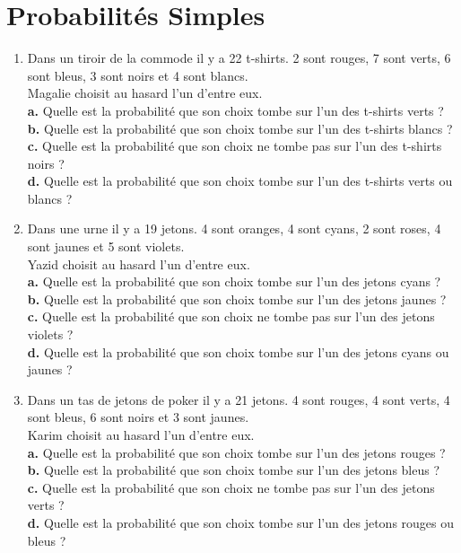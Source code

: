 \documentclass[11pt]{article}
\begin{document}
\section{Probabilités Simples}

\begin{exercice}
\begin{enumerate}[itemsep=1em]
	\item Dans un tiroir de la commode il y a 22 t-shirts. 2 sont rouges, 7 sont verts, 6 sont bleus, 3 sont noirs et 4 sont blancs.\\ Magalie choisit au hasard l'un d'entre eux.\\ \textbf {a.}  Quelle est la probabilité que son choix tombe sur l'un des t-shirts verts ?\\\textbf {b.}  Quelle est la probabilité que son choix tombe sur l'un des t-shirts blancs ?\\\textbf {c.}  Quelle est la probabilité que son choix ne tombe pas sur l'un des t-shirts noirs ?\\\textbf {d.}  Quelle est la probabilité que son choix tombe sur l'un des t-shirts verts ou blancs ?
	\item Dans une urne il y a 19 jetons. 4 sont oranges, 4 sont cyans, 2 sont roses, 4 sont jaunes et 5 sont violets.\\ Yazid choisit au hasard l'un d'entre eux.\\ \textbf {a.}  Quelle est la probabilité que son choix tombe sur l'un des jetons cyans ?\\\textbf {b.}  Quelle est la probabilité que son choix tombe sur l'un des jetons jaunes ?\\\textbf {c.}  Quelle est la probabilité que son choix ne tombe pas sur l'un des jetons violets ?\\\textbf {d.}  Quelle est la probabilité que son choix tombe sur l'un des jetons cyans ou jaunes ?
	\item Dans un tas de jetons de poker il y a 21 jetons. 4 sont rouges, 4 sont verts, 4 sont bleus, 6 sont noirs et 3 sont jaunes.\\ Karim choisit au hasard l'un d'entre eux.\\ \textbf {a.}  Quelle est la probabilité que son choix tombe sur l'un des jetons rouges ?\\\textbf {b.}  Quelle est la probabilité que son choix tombe sur l'un des jetons bleus ?\\\textbf {c.}  Quelle est la probabilité que son choix ne tombe pas sur l'un des jetons verts ?\\\textbf {d.}  Quelle est la probabilité que son choix tombe sur l'un des jetons rouges ou bleus ?
\end{enumerate}
\end{exercice}
\end{document}
